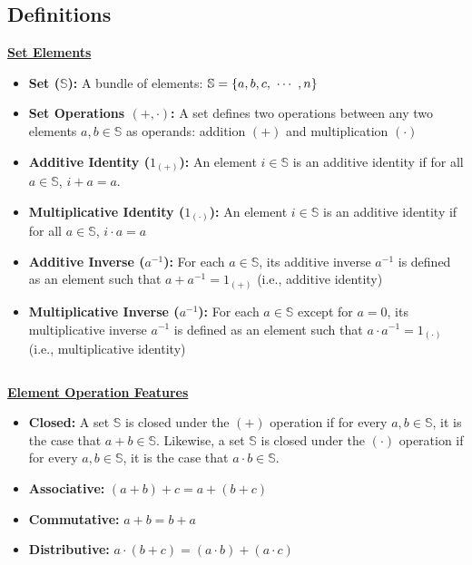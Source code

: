 
\subsection{Definitions}
\label{subsec:group-def}


\begin{tcolorbox}[title={\textbf{\tboxdef{\ref*{subsec:group-def}} Group}}]
\noindent \textbf{\underline{Set Elements}}
\begin{itemize}
\item \textbf{Set ($\mathbb{S}$):} A bundle of elements: $\mathbb{S} = \{a, b, c, \text{ } \text{$\cdots$} \text{ }, n\}$
\item \textbf{Set Operations $\bm{(+, \cdot)}$:} A set defines two operations between any two elements $a, b \in \mathbb{S}$ as operands: addition $(+)$ and multiplication $(\cdot)$
\item \textbf{Additive Identity ($1_{(+)}$):} An element $i \in \mathbb{S}$ is an additive identity if for all $a \in \mathbb{S}$, $i + a = a$.
\item \textbf{Multiplicative Identity ($1_{(\cdot)}$):} An element $i \in \mathbb{S}$ is an additive identity if for all $a \in \mathbb{S}$, $i \cdot a = a$
\item \textbf{Additive Inverse ($a^{-1}$):} For each $a \in \mathbb{S}$, its additive inverse $a^{-1}$ is defined as an element such that $a + a^{-1} = 1_{(+)}$ (i.e., additive identity)
\item \textbf{Multiplicative Inverse ($a^{-1}$):} For each $a \in \mathbb{S}$ except for $a = 0$, its multiplicative inverse $a^{-1}$ is defined as an element such that $a \cdot a^{-1} = 1_{(\cdot)}$ (i.e., multiplicative identity)
\end{itemize}

$ $

\noindent \textbf{\underline{Element Operation Features}}
\begin{itemize}
\item \textbf{Closed:} A set $\mathbb{S}$ is closed under the $(+)$ operation if for every $a, b \in \mathbb{S}$, it is the case that $a + b \in \mathbb{S}$. Likewise, a set $\mathbb{S}$ is closed under the $(\cdot)$ operation if for every $a, b \in \mathbb{S}$, it is the case that $a \cdot b \in \mathbb{S}$. 
\item \textbf{Associative:} $(a + b) + c = a + (b + c)$
\item \textbf{Commutative:} $a + b = b + a$
\item \textbf{Distributive:} $a \cdot (b + c) = (a \cdot b) + (a \cdot c)$
\end{itemize}



\end{tcolorbox}
